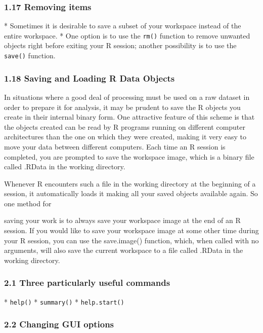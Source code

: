  \frametitle{1.17 Removing items}
 
*  Sometimes it is desirable to save a subset of your workspace instead of the entire workspace.
*  One option is to use the \texttt{rm()} function to remove unwanted objects right before exiting your R
 session; another possibility is to use the \texttt{save()} function.

 
 
 \frametitle{1.18 Saving and Loading R Data Objects}
 In situations where a good deal of processing must be used on a raw dataset in order to prepare
 it for analysis, it may be prudent to save the R objects you create in their internal binary form.
 One attractive feature of this scheme is that the objects created can be read by R programs
 running on different computer architectures than the one on which they were created, making it
 very easy to move your data between different computers. Each time an R session is completed,
 you are prompted to save the workspace image, which is a binary file called .RData in the
 working directory.
 
 
 Whenever R encounters such a file in the working directory at the beginning of a session,
 it automatically loads it making all your saved objects available again. So one method for
 
 saving your work is to always save your workspace image at the end of an R session. If you
 would like to save your workspace image at some other time during your R session, you can use
 the save.image() function, which, when called with no arguments, will also save the current
 workspace to a file called .RData in the working directory.
 
 
 
 
 \frametitle{2.1 Three particularly useful commands}
 
 
*  \texttt{help()}
*  \texttt{summary()}
*  \texttt{help.start()}

 
 
 
 \frametitle{2.2 Changing GUI options}
 

